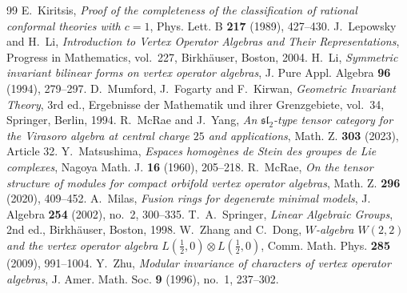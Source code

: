 \documentclass[10pt,a4paper]{amsart}
\numberwithin{equation}{section} \newtheorem{thm}{Theorem}[section] \newtheorem{lem}[thm]{Lemma} \newtheorem{ex}[thm]{Example} \newtheorem{prop}[thm]{Proposition} \newtheorem{cor}[thm]{Corollary} \newtheorem{defi}[thm]{Definition} \newtheorem{rmk}[thm]{Remark} \newtheorem{notation}[thm]{Notation}
\begin{document}
\begin{thebibliography}{99}
 E.~Kiritsis, \emph{Proof of the completeness of the classification of rational conformal theories with $c=1$}, Phys. Lett. B \textbf{217} (1989), 427--430.
 J.~Lepowsky and H.~Li, \emph{Introduction to Vertex Operator Algebras and Their Representations}, Progress in Mathematics, vol.~227, Birkh\"auser, Boston, 2004.
 H.~Li, \emph{Symmetric invariant bilinear forms on vertex operator algebras}, J. Pure Appl. Algebra \textbf{96} (1994), 279--297.
 D.~Mumford, J.~Fogarty and F.~Kirwan, \emph{Geometric Invariant Theory}, 3rd ed., Ergebnisse der Mathematik und ihrer Grenzgebiete, vol.~34, Springer, Berlin, 1994.
 R.~McRae and J.~Yang, \emph{An $\mathfrak{sl}_2$-type tensor category for the Virasoro algebra at central charge $25$ and applications}, Math. Z. \textbf{303} (2023), Article 32.
 Y.~Matsushima, \emph{Espaces homog\`enes de Stein des groupes de Lie complexes}, Nagoya Math. J. \textbf{16} (1960), 205--218.
 R.~McRae, \emph{On the tensor structure of modules for compact orbifold vertex operator algebras}, Math. Z. \textbf{296} (2020), 409--452.
 A.~Milas, \emph{Fusion rings for degenerate minimal models}, J. Algebra \textbf{254} (2002), no.~2, 300--335.
 T.~A.~Springer, \emph{Linear Algebraic Groups}, 2nd ed., Birkh\"auser, Boston, 1998.
 W.~Zhang and C.~Dong, \emph{$W$-algebra $W(2,2)$ and the vertex operator algebra $L(\frac12,0)\otimes L(\frac12,0)$}, Comm. Math. Phys. \textbf{285} (2009), 991--1004.
 Y.~Zhu, \emph{Modular invariance of characters of vertex operator algebras}, J. Amer. Math. Soc. \textbf{9} (1996), no.~1, 237--302.
\end{thebibliography}
\end{document}
